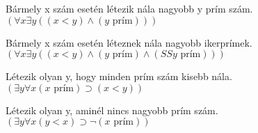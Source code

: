 \item
Bármely x szám esetén létezik nála nagyobb y prím szám.\\
$(\forall x \exists y ((x<y) \wedge (y \text{ prím})))$

\item
Bármely x szám esetén léteznek nála nagyobb ikerprímek.\\
$(\forall x \exists y ((x<y) \wedge (y \text{ prím}) \wedge (SSy \text{ prím})))$

\item
Létezik olyan y, hogy minden prím szám kisebb nála.\\
$(\exists y \forall x (x \text{ prím}) \supset (x<y))$

\item
Létezik olyan y, aminél nincs nagyobb prím szám.\\
$(\exists y \forall x (y<x) \supset \neg (x \text{ prím}))$